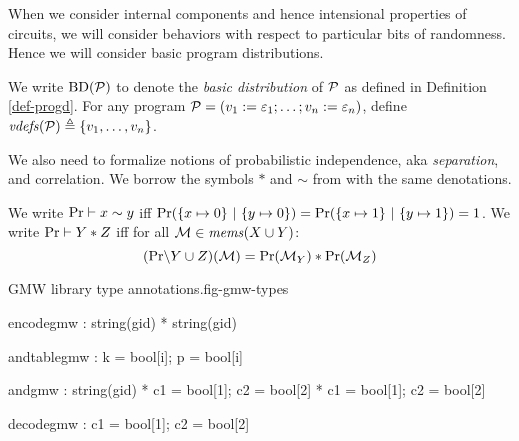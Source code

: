 When we consider internal components and hence intensional properties
of circuits, we will consider behaviors with respect to particular bits
of randomness. Hence we will consider basic program distributions. 
\begin{definition}
  We write $\mathrm{BD}(\mathcal{P})$ to denote the \emph{basic distribution} of
  $\mathcal{P}$ as defined in Definition \ref{def-progd}. For any program $\mathcal{P} =
  (v_1 := \varepsilon_1;\ldots;v_n := \varepsilon_n)$, define
  $\mathit{vdefs}(\mathcal{P}) \triangleq \{ v_1,\ldots,v_n \}$.
\end{definition}
We also need to formalize notions of probabilistic independence, aka
\emph{separation}, and correlation. We borrow the symbols $*$ and $\sim$
from \cite{barthe2019probabilistic} with the same denotations.
\begin{definition}
  We write $\mathrm{Pr} \vdash x \sim y$ iff $\mathrm{Pr}(\{ x \mapsto 0\}\ |\ \{ y \mapsto 0 \}) =
  \mathrm{Pr}(\{ x \mapsto 1\}\ |\ \{ y \mapsto 1 \}) = 1$.
  We write $\mathrm{Pr} \vdash Y * Z$ iff for all
    $\mathcal{M} \in \mathit{mems}(X \cup Y)$:
  $$(\mathrm{Pr}\backslash Y \cup Z)(\mathcal{M}) =
  \mathrm{Pr}(\mathcal{M}_Y) * \mathrm{Pr}(\mathcal{M}_Z)$$ 
\end{definition}

\begin{fpfig}[t]{GMW library type annotations.}{fig-gmw-types}
{\footnotesize
  \begin{verbatimtab}
   encodegmw   : string(gid) * string(gid)
    
   andtablegmw : { k = bool[i]; p = bool[i] }
    
   andgmw      : string(gid) *  { c1 = bool[1]; c2 = bool[2] } * { c1 = bool[1]; c2 = bool[2] }
    
   decodegmw   : { c1 = bool[1]; c2 = bool[2] }  \end{verbatimtab}
}
\end{fpfig}

